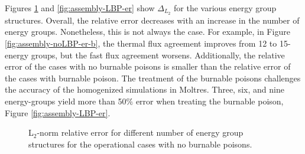 Figures \ref{fig:assembly-noLBP-er} and \ref{fig:assembly-LBP-er} show $\Delta_{L_2}$ for the various energy group structures.
Overall, the relative error decreases with an increase in the number of energy groups.
Nonetheless, this is not always the case.
For example, in Figure \ref{fig:assembly-noLBP-er-b}, the thermal flux agreement improves from 12 to 15-energy groups, but the fast flux agreement worsens.
Additionally, the relative error of the cases with no burnable poisons is smaller than the relative error of the cases with burnable poison.
The treatment of the burnable poisons challenges the accuracy of the homogenized simulations in Moltres.
Three, six, and nine energy-groups yield more than 50$\%$ error when treating the burnable poison, Figure \ref{fig:assembly-LBP-er}.

\begin{figure}[htbp!]
	\centering
	\hfill
    \caption{L$_2$-norm relative error for different number of energy group structures for the operational cases with no burnable poisons.}
	\label{fig:assembly-noLBP-er}
\end{figure}

